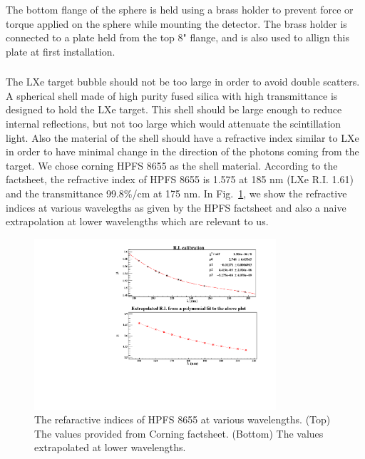 The bottom flange of the sphere is held using a brass holder to prevent force or torque applied on the sphere while mounting the detector. The 
brass holder is connected to a plate held from the top 8" flange, and is also used to allign this plate at first installation. 

\subsubsection{}
\label{subsubsec:sphere}

The LXe target bubble should not be too large in order to avoid double scatters. A spherical shell made of high purity fused silica 
with high transmittance is designed to hold the LXe target. This shell should be large enough to reduce internal reflections, but not too large which would 
attenuate the scintillation light. Also the material of the shell should have a refractive index similar to LXe in order to have 
minimal change in the direction of the photons coming from the target. We chose corning HPFS 8655 as the shell material. According 
to the factsheet, the refractive index of HPFS 8655 is 1.575 at 185 nm (LXe R.I. 1.61) and the transmittance 99.8\%/cm at 175 nm. 
In Fig.~\ref{fig:hpfsRIcalibration}, we show the refractive indices at various wavelegths as given by the HPFS factsheet and also 
a naive extrapolation at lower wavelengths which are relevant to us.

\begin{figure}
   \centering
   \includegraphics[width=0.8\textwidth]{RI-calibration.pdf}
   \caption{The refaractive indices of HPFS 8655 at various wavelengths. (Top) The values provided from Corning factsheet.
   (Bottom) The values extrapolated at lower wavelengths.} 
   \label{fig:hpfsRIcalibration}
\end{figure}


